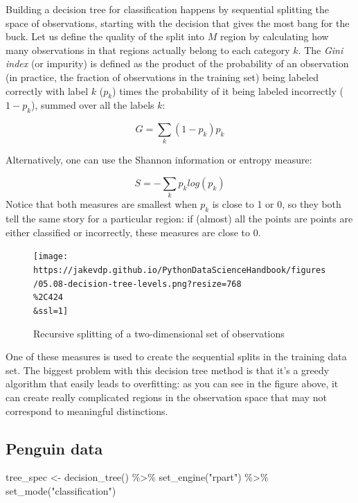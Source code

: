 \documentclass[
  letterpaper,
  DIV=11,
  numbers=noendperiod]{scrreprt}
\newenvironment{Shaded}{\begin{snugshade}}{\end{snugshade}}
\newcommand{\FunctionTok}[1]{\textcolor[rgb]{0.28,0.35,0.67}{#1}}
\newcommand{\NormalTok}[1]{\textcolor[rgb]{0.00,0.23,0.31}{#1}}
\newcommand{\OtherTok}[1]{\textcolor[rgb]{0.00,0.23,0.31}{#1}}
\newcommand{\SpecialCharTok}[1]{\textcolor[rgb]{0.37,0.37,0.37}{#1}}
\newcommand{\StringTok}[1]{\textcolor[rgb]{0.13,0.47,0.30}{#1}}
\begin{document}
Building a decision tree for classification happens by sequential
splitting the space of observations, starting with the decision that
gives the most bang for the buck. Let us define the quality of the split
into \(M\) region by calculating how many observations in that regions
actually belong to each category \(k\). The \emph{Gini index} (or
impurity) is defined as the product of the probability of an observation
(in practice, the fraction of observations in the training set) being
labeled correctly with label \(k\) (\(p_k\)) times the probability of it
being labeled incorrectly (\(1-p_k\)), summed over all the labels \(k\):

\[
G = \sum_k (1-p_k)p_k
\]

Alternatively, one can use the Shannon information or entropy measure:

\[
S = -\sum_k p_k log(p_k)
\] Notice that both measures are smallest when \(p_k\) is close to 1 or
0, so they both tell the same story for a particular region: if (almost)
all the points are points are either classified or incorrectly, these
measures are close to 0.

\begin{figure}

{\centering \texttt{[image: https://jakevdp.github.io/PythonDataScienceHandbook/figures/05.08-decision-tree-levels.png?resize=768\\\%2C424\\\&ssl=1]}

}

\caption{Recursive splitting of a two-dimensional set of observations}

\end{figure}

One of these measures is used to create the sequential splits in the
training data set. The biggest problem with this decision tree method is
that it's a greedy algorithm that easily leads to overfitting: as you
can see in the figure above, it can create really complicated regions in
the observation space that may not correspond to meaningful
distinctions.

\hypertarget{penguin-data-1}{%
\subsection{Penguin data}\label{penguin-data-1}}

\begin{Shaded}
\begin{Highlighting}[]
\NormalTok{tree\_spec }\OtherTok{\textless{}{-}} \FunctionTok{decision\_tree}\NormalTok{() }\SpecialCharTok{\%\textgreater{}\%}
  \FunctionTok{set\_engine}\NormalTok{(}\StringTok{"rpart"}\NormalTok{) }\SpecialCharTok{\%\textgreater{}\%}
  \FunctionTok{set\_mode}\NormalTok{(}\StringTok{"classification"}\NormalTok{)}
\end{Highlighting}
\end{Shaded}
\end{document}

